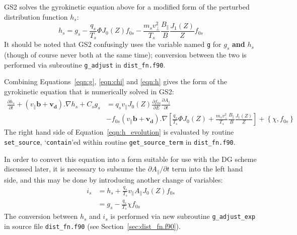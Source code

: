 \documentclass[10pt,a4paper]{article}
\newcommand{\dd}{\partial}
\begin{document}
GS2 solves the gyrokinetic equation above for a modified form of the perturbed
distribution function $h_s$:
\begin{equation}
  h_s = g_s - \frac{q_s}{T_s} \Phi J_0(Z) f_{0s} - \frac{m_s v_\perp^2}{T_s}
  \frac{B_\parallel}{B} \frac{J_1(Z)}{Z} f_{0s}
\label{eqn:h}
\end{equation}
It should be noted that GS2 confusingly uses the variable named \texttt{g} for
$g_s$ \textbf{and}\/ $h_s$ (though of course never both at the same time);
conversion between the two is performed via subroutine \texttt{g\_adjust} in
\texttt{dist\_fn.f90}.

Combining Equations~\ref{eqn:g}, \ref{eqn:chi} and \ref{eqn:h} gives the form of the
gyrokinetic equation that is numerically solved in GS2:
\begin{align}
  \frac{\dd h_s}{\dd t} + (v_\parallel \mathbf{b} + \mathbf{v_d}).\nabla h_s +
  C_s g_s & = q_s v_\parallel J_0(Z) \frac{\dd f_{0s}}{\dd E} \frac{\dd
    A_\parallel}{\dd t} \nonumber \\
  {}& - f_{0s}(v_\parallel \mathbf{b} + \mathbf{v_d}).\nabla 
  \left[ \frac{q_s}{T_s} \Phi J_0(Z) +\frac{m_s v_\perp^2}{T_s}
    \frac{B_\parallel}{B} \frac{J_1(Z)}{Z} \right] + \left\{ \chi,
    f_{0s}\right\} 
  \label{eqn:h_evolution}
\end{align}
The right hand side of Equation~\ref{eqn:h_evolution} is evaluated by routine
\texttt{set\_source}, `\texttt{contain}'ed within routine \texttt{get\_source\_term} in
\texttt{dist\_fn.f90}.

In order to convert this equation into a form suitable for use with the DG
scheme discussed later, it is necessary to subsume the $\dd A_\parallel / \dd
t$ term into the left hand side, and this may be done by introducing another
change of variables:
\begin{align}
  i_s & = h_s + \frac{q_s}{T_s} v_\parallel A_\parallel J_0(Z) f_{0s}
  \label{eqn:h2i} \\
  & = g_s - \frac{q_s}{T_s}  \chi f_{0s}
\end{align}
The conversion between $h_s$ and $i_s$ is performed via new subroutine
\texttt{g\_adjust\_exp} in source file \texttt{dist\_fn.f90} (see
Section~\ref{sec:dist_fn.f90}).
\end{document}
